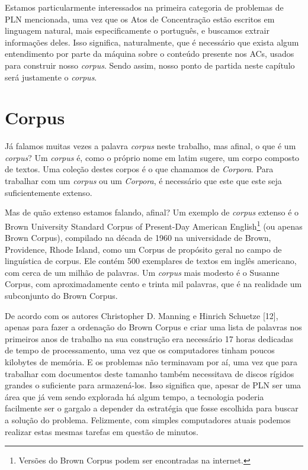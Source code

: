 \documentclass[11pt]{report}
\begin{document}
Estamos particularmente interessados na primeira
categoria de problemas de PLN mencionada, uma vez que os Atos de Concentração estão escritos em linguagem natural, mais especificamente o português, e buscamos extrair informações
deles. Isso significa, naturalmente, que é necessário que exista algum entendimento por parte da máquina sobre o conteúdo presente nos ACs, usados para construir nosso \textit{corpus}. Sendo
assim, nosso ponto de partida neste capítulo será justamente o \textit{corpus}.

\section{Corpus}

\indent\indent Já falamos muitas vezes a palavra \textit{corpus} neste trabalho, mas afinal, o que é um \textit{corpus}? Um \textit{corpus} é, como o próprio nome em latim sugere, um corpo composto de textos.
Uma coleção destes corpos é o que chamamos de \textit{Corpora}. Para trabalhar com um \textit{corpus} ou um \textit{Corpora}, é necessário que este que este seja suficientemente extenso.

Mas de quão extenso estamos falando, afinal? Um exemplo de \textit{corpus} extenso é o Brown University Standard Corpus of Present-Day American English\footnote[7]{
Versões do Brown Corpus podem ser encontradas na internet.} (ou apenas Brown Corpus), compilado na década de 1960 na universidade de Brown, Providence, Rhode Island, como um Corpus de
propósito geral no campo de linguística de corpus. Ele contém 500 exemplares de textos em inglês americano, com cerca de um milhão de palavras. Um \textit{corpus} mais modesto é o Susanne Corpus,
com aproximadamente cento e trinta mil palavras, que é na realidade um subconjunto do Brown Corpus.

De acordo com os autores Christopher D. Manning e Hinrich Schuetze [12], apenas para fazer a ordenação do Brown Corpus e criar uma lista de palavras nos primeiros anos de trabalho na
sua construção era necessário 17 horas dedicadas de tempo de processamento, uma vez que os computadores tinham poucos kilobytes de memória. E os problemas não terminavam por aí,
uma vez que para trabalhar com documentos deste tamanho também necessitava de discos rígidos grandes o suficiente para armazená-los. Isso significa que, apesar de PLN ser uma área
que já vem sendo explorada há algum tempo, a tecnologia poderia facilmente ser o gargalo a depender da estratégia que fosse escolhida para buscar a solução do problema. Felizmente,
com simples computadores atuais podemos realizar estas mesmas tarefas em questão de minutos.
\end{document}
